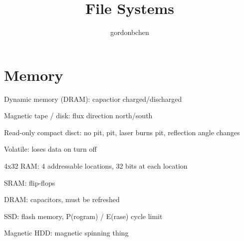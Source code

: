 \documentclass[11pt]{article}
\title{File Systems}
\author{gordonbchen}
\date{}
\begin{document}
\maketitle

\section{Memory}
Dynamic memory (DRAM): capactior charged/discharged

Magnetic tape / disk: flux direction north/south

Read-only compact disct: no pit, pit, laser burns pit, reflection angle changes


Volatile: loses data on turn off


4x32 RAM: 4 addressable locations, 32 bits at each location

SRAM: flip-flops

DRAM: capacitors, must be refreshed

SSD: flash memory, P(rogram) / E(rase) cycle limit

Magnetic HDD: magnetic spinning thing
\end{document}
